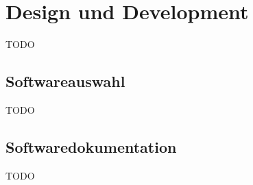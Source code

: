\section{Design und Development}
TODO

\subsection{Softwareauswahl}
TODO

\subsection{Softwaredokumentation}
TODO
